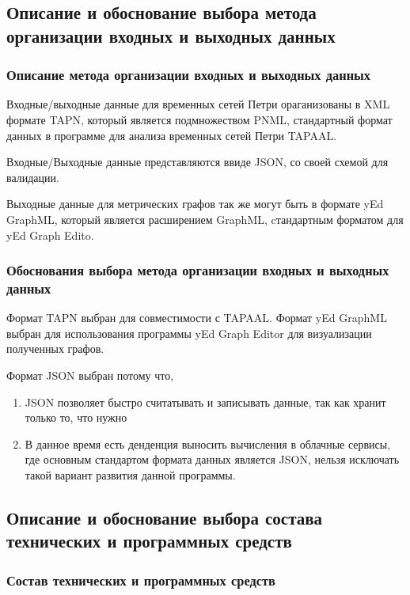 \documentclass{../TechDoc}
\begin{document}
	\subsection{Описание и обоснование выбора метода организации входных и
выходных данных}
	\subsubsection{Описание метода организации входных и выходных данных}
		Входные/выходные данные для временных сетей Петри ораганизованы в XML\cite{XMl} формате TAPN, который является подмножеством PNML\cite{PNML}, стандартный формат данных в программе для анализа временных сетей Петри TAPAAL.
		
		Входные/Выходные данные представляются ввиде JSON, со своей схемой для валидации.
		
		Выходные данные для метрических графов так же могут быть в формате yEd GraphML, который является расширением GraphML\cite{graphml}, cтандартным форматом для yEd Graph Edito\cite{yededitor}.
		
	\subsubsection{Обоснования выбора метода организации входных и выходных данных}
		Формат TAPN выбран для совместимости с TAPAAL. Формат yEd GraphML выбран для использования программы yEd Graph Editor для визуализации полученных графов. 
		
		Формат JSON выбран потому что,
		 \begin{enumerate}
		 	\item JSON позволяет быстро считатывать и записывать данные, так как хранит только то, что нужно
		 	\item В данное время есть денденция выносить вычисления в облачные сервисы, где основным стандартом формата данных является JSON, нельзя исключать такой вариант развития данной программы.
		 \end{enumerate}
	 
	 \subsection{Описание и обоснование выбора состава технических и программных средств}
	 \subsubsection{Состав технических и программных средств}
	 
\end{document}
